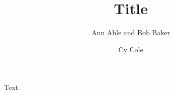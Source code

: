 \documentclass{achemso}
\author{Ann Able and Bob Baker}
\affiliation{Univ A}
\author{Cy Cole}
\affiliation{Univ B}
\title{Title}
\begin{document}
Text.
\end{document}
